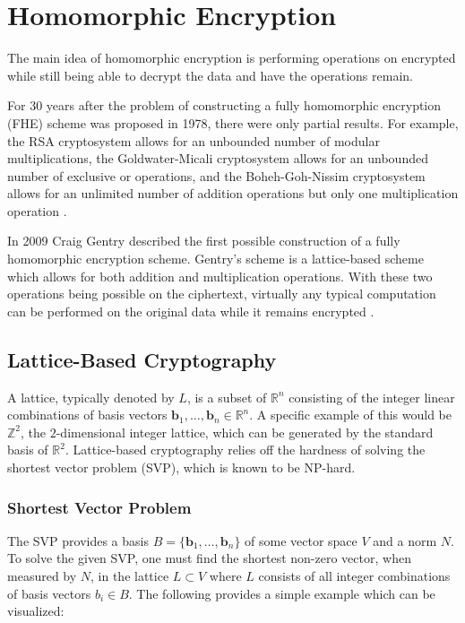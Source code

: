\chapter{Homomorphic Encryption}

The main idea of homomorphic encryption is performing operations on encrypted while still being able to decrypt the data and have the operations remain.

For 30 years after the problem of constructing a fully homomorphic encryption (FHE) scheme was proposed in 1978, there were only partial results. For example, the RSA cryptosystem allows for an unbounded number of modular multiplications, the Goldwater-Micali cryptosystem allows for an unbounded number of exclusive or operations, and the Boheh-Goh-Nissim cryptosystem allows for an unlimited number of addition operations but only one multiplication operation \cite{10.1145/359340.359342}\cite{10.1145/800070.802212}\cite{10.1007/978-3-540-30576-7_18}.

In 2009 Craig Gentry described the first possible construction of a fully homomorphic encryption scheme. Gentry's scheme is a lattice-based scheme which allows for both addition and multiplication operations. With these two operations being possible on the ciphertext, virtually any typical computation can be performed on the original data while it remains encrypted \cite{gentry}.

\section{Lattice-Based Cryptography}

A lattice, typically denoted by $L$, is a subset of $\mathbb{R}^n$ consisting of the integer linear combinations of basis vectors $\mathbf{b}_1, \dots, \mathbf{b}_n \in \mathbb{R}^n$. A specific example of this would be $\mathbb{Z}^2$, the $2$-dimensional integer lattice, which can be generated by the standard basis of $\mathbb{R}^2$. Lattice-based cryptography relies off the hardness of solving the shortest vector problem (SVP), which is known to be NP-hard.

\subsection{Shortest Vector Problem}

The SVP provides a basis $B = \{\mathbf{b}_1, \dots, \mathbf{b}_n\}$ of some vector space $V$ and a norm $N$. To solve the given SVP, one must find the shortest non-zero vector, when measured by $N$, in the lattice $L \subset V$ where $L$ consists of all integer combinations of basis vectors $b_i \in B$. The following provides a simple example which can be visualized:

